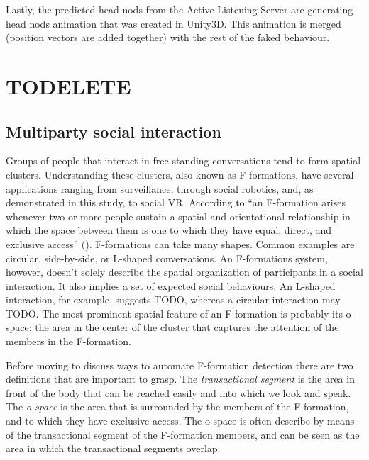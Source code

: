 \documentclass[]{simple-thesis}
\begin{document}
Lastly, the predicted head nods from the Active Listening Server are generating head nods animation that was created in Unity3D.
This animation is merged (position vectors are added together) with the rest of the faked behaviour.


\chapter{TODELETE}

\section{Multiparty social interaction}

Groups of people that interact in free standing conversations tend to form spatial clusters.
Understanding these clusters, also known as F-formations, have several applications ranging from surveillance, through social robotics, and, as demonstrated in this study, to social VR.
According to \citeauthor{Kendon1990} ``an F-formation arises whenever two or more people sustain a spatial and orientational relationship in which the space between them is one to which they have equal, direct, and exclusive access'' (\citeyear[p. 209]{Kendon1990}).
F-formations can take many shapes.
Common examples are circular, side-by-side, or L-shaped conversations.
An F-formations system, however, doesn't solely describe the spatial organization of participants in a social interaction.
It also implies a set of expected social behaviours.
An L-shaped interaction, for example, suggests TODO, whereas a circular interaction may TODO.
The most prominent spatial feature of an F-formation is probably its o-space: the area in the center of the cluster that captures the attention of the members in the F-formation.

Before moving to discuss ways to automate F-formation detection there are two definitions that are important to grasp.
The \textit{transactional segment} is the area in front of the body that can be reached easily and into which we look and speak.
The \textit{o-space} is the area that is surrounded by the members of the F-formation, and to which they have exclusive access.
The o-space is often describe by means of the transactional segment of the F-formation members, and can be seen as the area in which the transactional segments overlap.
\end{document}
